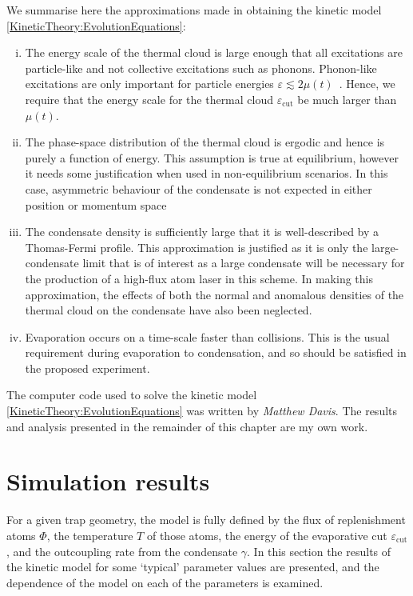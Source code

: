 We summarise here the approximations made in obtaining the kinetic model \eqref{KineticTheory:EvolutionEquations}:
\begin{enumerate}[(i)]
    \item The energy scale of the thermal cloud is large enough that all excitations are particle-like and not collective excitations such as phonons. Phonon-like excitations are only important for particle energies $\varepsilon \lesssim 2\mu(t)$~\citep[\S 8.3.1]{PethickSmith}. Hence, we require that the energy scale for the thermal cloud $\varepsilon_\text{cut}$ be much larger than $\mu(t)$.
    \item The phase-space distribution of the thermal cloud is ergodic and hence is purely a function of energy. This assumption is true at equilibrium, however it needs some justification when used in non-equilibrium scenarios. In this case, asymmetric behaviour of the condensate is not expected in either position or momentum space 
    \item The condensate density is sufficiently large that it is well-described by a Thomas-Fermi profile. This approximation is justified as it is only the large-condensate limit that is of interest as a large condensate will be necessary for the production of a high-flux atom laser in this scheme. In making this approximation, the effects of both the normal and anomalous densities of the thermal cloud on the condensate have also been neglected.
    \item Evaporation occurs on a time-scale faster than collisions. This is the usual requirement during evaporation to condensation, and so should be satisfied in the proposed experiment.
\end{enumerate}

The computer code used to solve the kinetic model \eqref{KineticTheory:EvolutionEquations} was written by \emph{Matthew Davis}. The results and analysis presented in the remainder of this chapter are my own work.

\section{Simulation results}
\label{KineticTheory:Results}

For a given trap geometry, the model is fully defined by the flux of replenishment atoms $\Phi$, the temperature $T$ of those atoms, the energy of the evaporative cut $\varepsilon_\text{cut}$, and the outcoupling rate from the condensate $\gamma$. In this section the results of the kinetic model for some `typical' parameter values are presented, and the dependence of the model on each of the parameters is examined.

